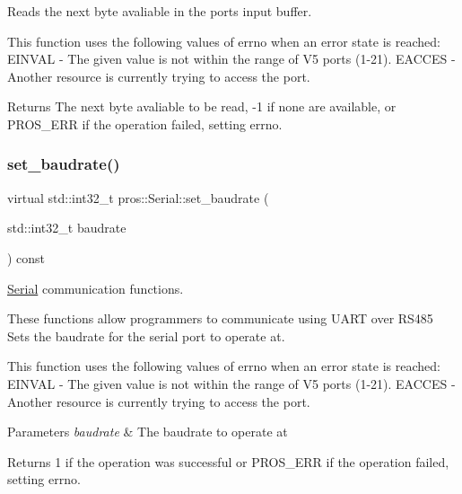 Reads the next byte avaliable in the port\textquotesingle{}s input buffer. 

This function uses the following values of errno when an error state is reached\+: E\+I\+N\+V\+AL -\/ The given value is not within the range of V5 ports (1-\/21). E\+A\+C\+C\+ES -\/ Another resource is currently trying to access the port.

\begin{DoxyReturn}{Returns}
The next byte avaliable to be read, -\/1 if none are available, or P\+R\+O\+S\+\_\+\+E\+RR if the operation failed, setting errno. 
\end{DoxyReturn}
\mbox{\label{classpros_1_1Serial_ab8c6d804852e6689d6c92c6b2c439824}} 
\subsubsection{\texorpdfstring{set\+\_\+baudrate()}{set\_baudrate()}}
{\footnotesize\ttfamily virtual std\+::int32\+\_\+t pros\+::\+Serial\+::set\+\_\+baudrate (\begin{DoxyParamCaption}\item[{std\+::int32\+\_\+t}]{baudrate }\end{DoxyParamCaption}) const\hspace{0.3cm}{\ttfamily [virtual]}}



\hyperlink{classpros_1_1Serial}{Serial} communication functions. 

These functions allow programmers to communicate using U\+A\+RT over R\+S485 Sets the baudrate for the serial port to operate at.

This function uses the following values of errno when an error state is reached\+: E\+I\+N\+V\+AL -\/ The given value is not within the range of V5 ports (1-\/21). E\+A\+C\+C\+ES -\/ Another resource is currently trying to access the port.


\begin{DoxyParams}{Parameters}
{\em baudrate} & The baudrate to operate at\\
\hline
\end{DoxyParams}
\begin{DoxyReturn}{Returns}
1 if the operation was successful or P\+R\+O\+S\+\_\+\+E\+RR if the operation failed, setting errno. 
\end{DoxyReturn}
\mbox{\label{classpros_1_1Serial_a865313d3b482d9ffdd380edc36273b24}} 
